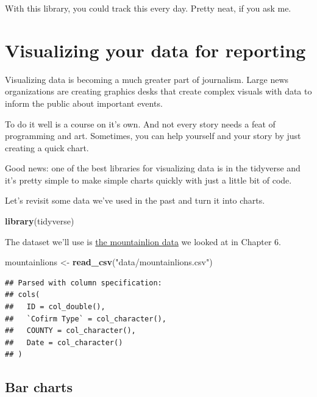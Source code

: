 \documentclass[]{book}
\newenvironment{Shaded}{\begin{snugshade}}{\end{snugshade}}
\newcommand{\KeywordTok}[1]{\textcolor[rgb]{0.13,0.29,0.53}{\textbf{#1}}}
\newcommand{\NormalTok}[1]{#1}
\newcommand{\StringTok}[1]{\textcolor[rgb]{0.31,0.60,0.02}{#1}}
\begin{document}
With this library, you could track this every day. Pretty neat, if you ask me.

\hypertarget{visualizing-your-data-for-reporting}{%
\chapter{Visualizing your data for reporting}\label{visualizing-your-data-for-reporting}}

Visualizing data is becoming a much greater part of journalism. Large news organizations are creating graphics desks that create complex visuals with data to inform the public about important events.

To do it well is a course on it's own. And not every story needs a feat of programming and art. Sometimes, you can help yourself and your story by just creating a quick chart.

Good news: one of the best libraries for visualizing data is in the tidyverse and it's pretty simple to make simple charts quickly with just a little bit of code.

Let's revisit some data we've used in the past and turn it into charts.

\begin{Shaded}
\begin{Highlighting}[]
\KeywordTok{library}\NormalTok{(tidyverse)}
\end{Highlighting}
\end{Shaded}

The dataset we'll use is \href{https://unl.box.com/s/xjipgkesl9rjmng4weg77vb73xt41apf}{the mountainlion data} we looked at in Chapter 6.

\begin{Shaded}
\begin{Highlighting}[]
\NormalTok{mountainlions <-}\StringTok{ }\KeywordTok{read_csv}\NormalTok{(}\StringTok{"data/mountainlions.csv"}\NormalTok{)}
\end{Highlighting}
\end{Shaded}

\begin{verbatim}
## Parsed with column specification:
## cols(
##   ID = col_double(),
##   `Cofirm Type` = col_character(),
##   COUNTY = col_character(),
##   Date = col_character()
## )
\end{verbatim}

\hypertarget{bar-charts}{%
\section{Bar charts}\label{bar-charts}}
\end{document}

